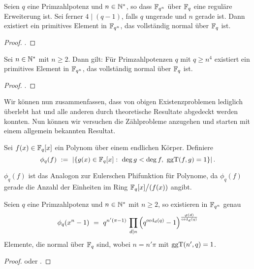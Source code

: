\begin{satz}
  Seien $q$ eine Primzahlpotenz und $n \in \mathbb{N}^\ast$, so dass
  $\mathbb{F}_{q^n}$ über $\mathbb{F}_q$ eine reguläre Erweiterung ist. Sei ferner
  $4\mid (q-1)$, falls $q$ ungerade und $n$ gerade ist. Dann existiert ein
  primitives Element in $\mathbb{F}_{q^n}$, das vollständig normal über $\mathbb{F}_q$ ist.
\end{satz}
\begin{proof}
  \autocite[Theorem 1.4]{hachenberger2001}.
\end{proof}


\begin{satz}
  Sei $n\in \mathbb{N}^\ast$ mit $n\geq 2$. Dann gilt:
  Für Primzahlpotenzen $q$ mit $q \geq n^4$ existiert ein primitives Element in 
  $\mathbb{F}_{q^n}$, das vollständig normal über $\mathbb{F}_q$ ist.
\end{satz}
\begin{proof}
  \autocite[Theorem 2]{hachenberger2014}.
\end{proof}

Wir können nun zusammenfassen, dass von obigen Existenzproblemen lediglich
 überlebt hat und alle anderen durch theoretische Resultate
abgedeckt werden konnten. Nun können wir versuchen die Zählprobleme anzugehen
und starten mit einem allgemein bekannten Resultat.

\begin{definition}
  Sei $f(x) \in \mathbb{F}_q[x]$ ein Polynom über einem endlichen Körper. Definiere
  \[ \phi_q(f) \speq{:=} |\{ g(x) \in \F_q[x]:\ 
    \deg g < \deg f,\ \ggT(f,g) = 1\}|\,.\]
\end{definition}

\begin{bemerkung}
  $\phi_q(f)$ ist das Analogon zur Eulerschen Phifunktion für Polynome, da
   $\phi_q(f)$ gerade die Anzahl der Einheiten im Ring $\mathbb{F}_q[x]\big/(f(x))$
   angibt.
\end{bemerkung}

\begin{satz}
  \label{satz:anzahl_normal}
  Seien $q$ eine Primzahlpotenz und $n\in \mathbb{N}^\ast$ mit $n\geq 2$, so existieren
  in $\mathbb{F}_{q^n}$ genau 
  \[ \phi_q(x^n-1) \ =\  q^{n'(\pi-1)}\,\prod_{d\mid n}
    \left( q^{\operatorname{ord}_d(q)} -1 \right)^{\frac{\varphi(d)}{\operatorname{ord}_d(q)}}\]
  Elemente, die normal über $\mathbb{F}_q$ sind, wobei $n = n'\pi$ mit $\operatorname{ggT}(n',q) = 1$.
\end{satz}
\begin{proof}
  \autocite[Theorem 3.73]{lidl1997finite} oder 
  \autocite[Theorem 10.5]{hachenberger1997finite}.
\end{proof}

